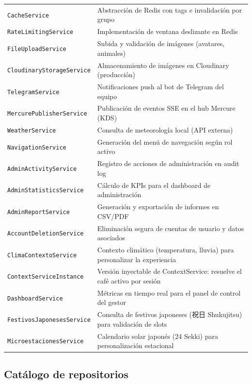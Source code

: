 \documentclass[12pt,a4paper,twoside,openright]{report}
\begin{document}
\begin{longtable}{@{}lp{8cm}@{}}
  \texttt{CacheService}                & Abstracción de Redis con tags e invalidación por grupo\\
  \texttt{RateLimitingService}         & Implementación de ventana deslizante en Redis\\
  \texttt{FileUploadService}           & Subida y validación de imágenes (avatares, animales)\\
  \texttt{CloudinaryStorageService}    & Almacenamiento de imágenes en Cloudinary (producción)\\
  \texttt{TelegramService}             & Notificaciones push al bot de Telegram del equipo\\
  \texttt{MercurePublisherService}     & Publicación de eventos SSE en el hub Mercure (KDS)\\
  \texttt{WeatherService}              & Consulta de meteorología local (API externa)\\
  \texttt{NavigationService}           & Generación del menú de navegación según rol activo\\
  \texttt{AdminActivityService}        & Registro de acciones de administración en audit log\\
  \texttt{AdminStatisticsService}      & Cálculo de KPIs para el dashboard de administración\\
  \texttt{AdminReportService}          & Generación y exportación de informes en CSV/PDF\\
  \texttt{AccountDeletionService}      & Eliminación segura de cuentas de usuario y datos asociados\\
  \texttt{ClimaContextoService}        & Contexto climático (temperatura, lluvia) para personalizar la experiencia\\
  \texttt{ContextServiceInstance}      & Versión inyectable de ContextService: resuelve el café activo por sesión\\
  \texttt{DashboardService}            & Métricas en tiempo real para el panel de control del gestor\\
  \texttt{FestivosJaponesesService}    & Consulta de festivos japoneses (祝日 Shukujitsu) para validación de slots\\
  \texttt{MicroestacionesService}      & Calendario solar japonés (24 Sekki) para personalización estacional\\
\end{longtable}

\subsection{Catálogo de repositorios}
\label{subsec:repositorios}
\end{document}
